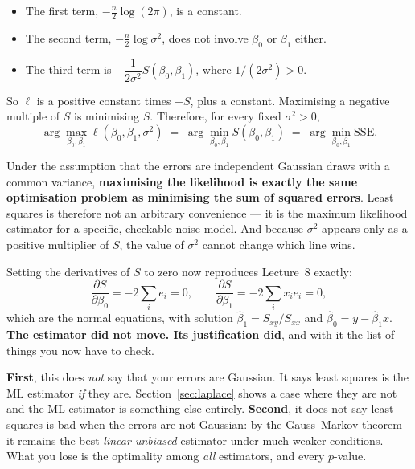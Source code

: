\documentclass[11pt]{article}
\begin{document}
\begin{itemize}[leftmargin=*]
  \item The first term, $-\tfrac{n}{2}\log(2\pi)$, is a constant.
  \item The second term, $-\tfrac{n}{2}\log\sigma^2$, does not involve
    $\beta_0$ or $\beta_1$ either.
  \item The third term is $-\dfrac{1}{2\sigma^2} S(\beta_0, \beta_1)$, where
    $1/(2\sigma^2) > 0$.
\end{itemize}

So $\ell$ is a positive constant times $-S$, plus a constant. Maximising a
negative multiple of $S$ is minimising $S$. Therefore, for every fixed
$\sigma^2 > 0$,
\begin{equation}
  \arg\max_{\beta_0,\beta_1} \ell(\beta_0,\beta_1,\sigma^2)
  \;=\;
  \arg\min_{\beta_0,\beta_1} S(\beta_0,\beta_1)
  \;=\;
  \arg\min_{\beta_0,\beta_1} \mathrm{SSE} .
  \label{eq:central}
\end{equation}

\begin{keyidea}
Under the assumption that the errors are independent Gaussian draws with a
common variance, \textbf{maximising the likelihood is exactly the same
optimisation problem as minimising the sum of squared errors}. Least squares
is therefore not an arbitrary convenience --- it is the maximum likelihood
estimator for a specific, checkable noise model. And because $\sigma^2$
appears only as a positive multiplier of $S$, the value of $\sigma^2$ cannot
change which line wins.
\end{keyidea}

Setting the derivatives of $S$ to zero now reproduces Lecture~8 exactly:
\[
  \frac{\partial S}{\partial \beta_0} = -2\sum_i e_i = 0,
  \qquad
  \frac{\partial S}{\partial \beta_1} = -2\sum_i x_i e_i = 0,
\]
which are the normal equations, with solution
$\hat\beta_1 = S_{xy}/S_{xx}$ and $\hat\beta_0 = \bar y - \hat\beta_1\bar x$.
\textbf{The estimator did not move. Its justification did}, and with it the
list of things you now have to check.

\begin{caution}
\textbf{First}, this does \emph{not} say that your errors are Gaussian. It
says least squares is the ML estimator \emph{if} they are. Section~\ref{sec:laplace}
shows a case where they are not and the ML estimator is something else
entirely. \textbf{Second}, it does not say least squares is bad when the errors
are not Gaussian: by the Gauss--Markov theorem it remains the best
\emph{linear unbiased} estimator under much weaker conditions. What you lose is
the optimality among \emph{all} estimators, and every $p$-value.
\end{caution}
\end{document}

